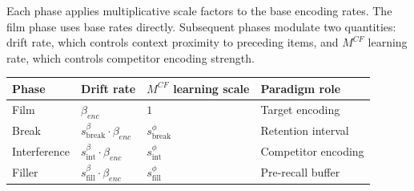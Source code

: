 \documentclass[
  man,
  floatsintext,
  longtable,
  nolmodern,
  notxfonts,
  notimes,
  draftfirst,
  colorlinks=true,linkcolor=blue,citecolor=blue,urlcolor=blue]{apa7}
\begin{document}
Each phase applies multiplicative scale factors to the base encoding
rates. The film phase uses base rates directly. Subsequent phases
modulate two quantities: drift rate, which controls context proximity to
preceding items, and \(M^{CF}\) learning rate, which controls competitor
encoding strength.

\begin{table}

{\caption{{Phase-specific encoding rates. Drift scales multiply
\(\beta_{enc}\) and are clipped to
\([0, 1]\).}{\label{tbl-phase-scales}}}
\vspace{-20pt}}

\begin{longtable}[]{@{}
  >{\raggedright\arraybackslash}p{}
  >{\raggedright\arraybackslash}p{}
  >{\raggedright\arraybackslash}p{}
  >{\raggedright\arraybackslash}p{}@{}}
\toprule\noalign{}
\begin{minipage}[b]{\linewidth}\raggedright
Phase
\end{minipage} & \begin{minipage}[b]{\linewidth}\raggedright
Drift rate
\end{minipage} & \begin{minipage}[b]{\linewidth}\raggedright
\(M^{CF}\) learning scale
\end{minipage} & \begin{minipage}[b]{\linewidth}\raggedright
Paradigm role
\end{minipage} \\
\midrule\noalign{}
\endhead
\bottomrule\noalign{}
\endlastfoot
Film & \(\beta_{enc}\) & \(1\) & Target encoding \\
Break & \(s^{\beta}_\text{break} \cdot \beta_{enc}\) &
\(s^{\phi}_\text{break}\) & Retention interval \\
Interference & \(s^{\beta}_\text{int} \cdot \beta_{enc}\) &
\(s^{\phi}_\text{int}\) & Competitor encoding \\
Filler & \(s^{\beta}_\text{fill} \cdot \beta_{enc}\) &
\(s^{\phi}_\text{fill}\) & Pre-recall buffer \\
\end{longtable}

\end{table}
\end{document}
